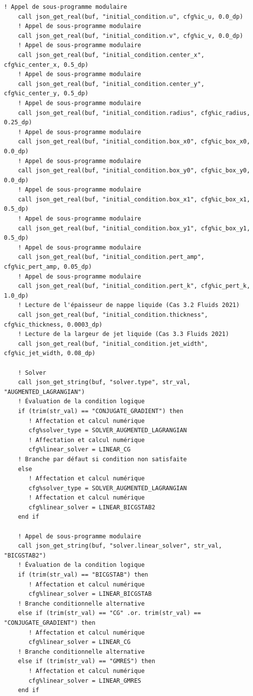 \documentclass[10pt,a4paper,oneside]{book}
\begin{document}
\begin{lstlisting}[language={[95]Fortran}]
    ! Appel de sous-programme modulaire
    call json_get_real(buf, "initial_condition.u", cfg%ic_u, 0.0_dp)
    ! Appel de sous-programme modulaire
    call json_get_real(buf, "initial_condition.v", cfg%ic_v, 0.0_dp)
    ! Appel de sous-programme modulaire
    call json_get_real(buf, "initial_condition.center_x", cfg%ic_center_x, 0.5_dp)
    ! Appel de sous-programme modulaire
    call json_get_real(buf, "initial_condition.center_y", cfg%ic_center_y, 0.5_dp)
    ! Appel de sous-programme modulaire
    call json_get_real(buf, "initial_condition.radius", cfg%ic_radius, 0.25_dp)
    ! Appel de sous-programme modulaire
    call json_get_real(buf, "initial_condition.box_x0", cfg%ic_box_x0, 0.0_dp)
    ! Appel de sous-programme modulaire
    call json_get_real(buf, "initial_condition.box_y0", cfg%ic_box_y0, 0.0_dp)
    ! Appel de sous-programme modulaire
    call json_get_real(buf, "initial_condition.box_x1", cfg%ic_box_x1, 0.5_dp)
    ! Appel de sous-programme modulaire
    call json_get_real(buf, "initial_condition.box_y1", cfg%ic_box_y1, 0.5_dp)
    ! Appel de sous-programme modulaire
    call json_get_real(buf, "initial_condition.pert_amp", cfg%ic_pert_amp, 0.05_dp)
    ! Appel de sous-programme modulaire
    call json_get_real(buf, "initial_condition.pert_k", cfg%ic_pert_k, 1.0_dp)
    ! Lecture de l'épaisseur de nappe liquide (Cas 3.2 Fluids 2021)
    call json_get_real(buf, "initial_condition.thickness", cfg%ic_thickness, 0.0003_dp)
    ! Lecture de la largeur de jet liquide (Cas 3.3 Fluids 2021)
    call json_get_real(buf, "initial_condition.jet_width", cfg%ic_jet_width, 0.08_dp)

    ! Solver
    call json_get_string(buf, "solver.type", str_val, "AUGMENTED_LAGRANGIAN")
    ! Évaluation de la condition logique
    if (trim(str_val) == "CONJUGATE_GRADIENT") then
       ! Affectation et calcul numérique
       cfg%solver_type = SOLVER_AUGMENTED_LAGRANGIAN
       ! Affectation et calcul numérique
       cfg%linear_solver = LINEAR_CG
    ! Branche par défaut si condition non satisfaite
    else
       ! Affectation et calcul numérique
       cfg%solver_type = SOLVER_AUGMENTED_LAGRANGIAN
       ! Affectation et calcul numérique
       cfg%linear_solver = LINEAR_BICGSTAB2
    end if

    ! Appel de sous-programme modulaire
    call json_get_string(buf, "solver.linear_solver", str_val, "BICGSTAB2")
    ! Évaluation de la condition logique
    if (trim(str_val) == "BICGSTAB") then
       ! Affectation et calcul numérique
       cfg%linear_solver = LINEAR_BICGSTAB
    ! Branche conditionnelle alternative
    else if (trim(str_val) == "CG" .or. trim(str_val) == "CONJUGATE_GRADIENT") then
       ! Affectation et calcul numérique
       cfg%linear_solver = LINEAR_CG
    ! Branche conditionnelle alternative
    else if (trim(str_val) == "GMRES") then
       ! Affectation et calcul numérique
       cfg%linear_solver = LINEAR_GMRES
    end if


\end{lstlisting}
\end{document}
